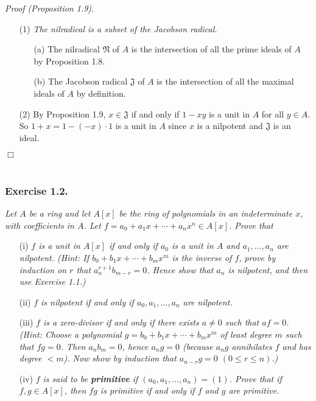 \documentclass{article}
\begin{document}
\emph{Proof (Proposition 1.9).}
\begin{enumerate}
\item[(1)]
  \emph{The nilradical is a subset of the Jacobson radical.}
  \begin{enumerate}
  \item[(a)]
    The nilradical $\mathfrak{N}$ of $A$ is the intersection of all the prime ideals of $A$
    by Proposition 1.8.
  \item[(b)]
    The Jacobson radical $\mathfrak{J}$ of $A$ is
    the intersection of all the maximal ideals of $A$
    by definition.
  \end{enumerate}

\item[(2)]
  By Proposition 1.9,
  $x \in \mathfrak{J}$ if and only if
  $1-xy$ is a unit in $A$ for all $y \in A$.
  So $1+x = 1 - (-x) \cdot 1$ is a unit in $A$
  since $x$ is a nilpotent and $\mathfrak{J}$ is an ideal.
\end{enumerate}
$\Box$ \\\\






\subsubsection*{Exercise 1.2.}
\emph{Let $A$ be a ring and
let $A[x]$ be the ring of polynomials in an indeterminate $x$,
with coefficients in $A$.
Let $f = a_0 + a_1 x + \cdots + a_n x^n \in A[x]$.
Prove that}
\begin{enumerate}
\item[(i)]
  \emph{$f$ is a unit in $A[x]$ if and only if
  $a_0$ is a unit in $A$ and
  $a_1, \ldots, a_n$ are nilpotent.
  (Hint: If $b_0 + b_1 x + \cdots + b_m x^m$ is the inverse of $f$,
  prove by induction on $r$ that $a_n^{r+1} b_{m-r} = 0$.
  Hence show that $a_n$ is nilpotent, and then use Exercise 1.1.)}

\item[(ii)]
  \emph{$f$ is nilpotent if and only if
  $a_0, a_1, \ldots, a_n$ are nilpotent.}

\item[(iii)]
  \emph{$f$ is a zero-divisor if and only if
  there exists $a \neq 0$ such that $af = 0$.
  (Hint: Choose a polynomial $g = b_0 + b_1 x + \cdots + b_m x^m$
  of least degree $m$ such that $fg = 0$.
  Then $a_n b_m = 0$, hence $a_n g = 0$
  (because $a_n g$ annihilates $f$ and has degree $< m$).
  Now show by induction that $a_{n-r}g = 0$ $(0 \leq r \leq n)$.)}

\item[(iv)]
  \emph{$f$ is said to be \textbf{primitive} if $(a_0, a_1, \ldots, a_n) = (1)$.
  Prove that if $f, g \in A[x]$, then $fg$ is primitive if and only if
  $f$ and $g$ are primitive.} \\
\end{enumerate}
\end{document}
